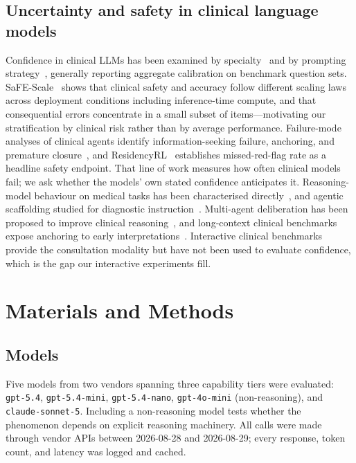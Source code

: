 \documentclass[journal,twoside]{IEEEtran}
\begin{document}
\subsection{Uncertainty and safety in clinical language models}
Confidence in clinical LLMs has been examined by specialty~\cite{gastro2025} and by prompting
strategy~\cite{promptmed2025}, generally reporting aggregate calibration on benchmark question sets.
SaFE-Scale~\cite{safescale2026} shows that clinical safety and accuracy follow different scaling
laws across deployment conditions including inference-time compute, and that consequential errors
concentrate in a small subset of items---motivating our stratification by clinical risk rather than
by average performance. Failure-mode analyses of clinical agents identify information-seeking
failure, anchoring, and premature closure~\cite{infoseek2026,premature2026,clinmm2026}, and
ResidencyRL~\cite{residency2026} establishes missed-red-flag rate as a headline safety endpoint.
That line of work measures how often clinical models fail; we ask whether the models' own stated
confidence anticipates it. Reasoning-model behaviour on medical tasks has been characterised
directly~\cite{r1med2025}, and agentic scaffolding studied for diagnostic
instruction~\cite{scaffold2026,grasp2026}. Multi-agent deliberation has been proposed to improve
clinical reasoning~\cite{ophtha2026,drl2026}, and long-context clinical
benchmarks expose anchoring to early interpretations~\cite{realicu2026}. Interactive clinical
benchmarks~\cite{agentclinic} provide the consultation modality but have not been used to evaluate
confidence, which is the gap our interactive experiments fill.

\section{Materials and Methods}

\subsection{Models}
Five models from two vendors spanning three capability tiers were evaluated:
\texttt{gpt-5.4}, \texttt{gpt-5.4-mini}, \texttt{gpt-5.4-nano}, \texttt{gpt-4o-mini} (non-reasoning),
and \texttt{claude-sonnet-5}. Including a non-reasoning model tests whether the phenomenon depends on
explicit reasoning machinery. All calls were made through vendor APIs between 2026-08-28 and
2026-08-29; every response, token count, and latency was logged and cached.
\end{document}
